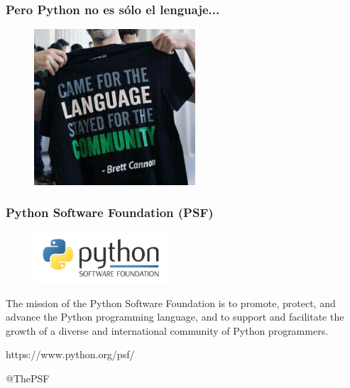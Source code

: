 \documentclass[18pt]{beamer}
\begin{document}
\begin{frame}

	\frametitle{Pero Python no es sólo el lenguaje...}
	   
	\begin{figure}
		\includegraphics[width=6cm]{images/tshirt_quote.jpg}
	\end{figure}	
	
\end{frame}


\begin{frame}

	\frametitle{Python Software Foundation (PSF)}
	
	\begin{figure}
		\includegraphics[width=5cm]{images/psf.png}
	\end{figure}
	
	The mission of the Python Software Foundation is to promote, protect, 
	and advance the Python programming language, and to support and 
	facilitate the growth of a diverse and international 
	community of Python programmers.


	\vspace{0.6cm}    
	\centerline{https://www.python.org/psf/}
	
	\vspace{0.4cm}
	\centerline{@ThePSF}
	
\end{frame}
\end{document}
